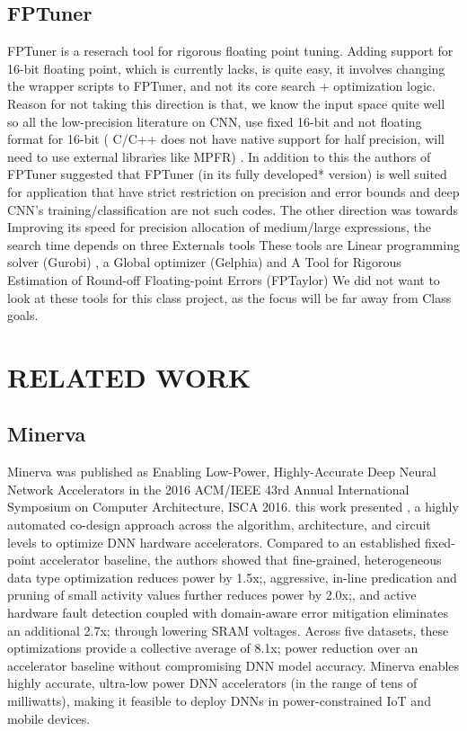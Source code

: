 \documentclass[letterpaper, 10 pt, conference]{ieeeconf}
\begin{document}
\subsection{FPTuner}

FPTuner is a reserach tool for rigorous floating point tuning. Adding support for 16-bit floating point, which is currently
lacks, is quite easy, it involves changing the wrapper scripts to FPTuner, and not its core search + optimization logic.
Reason for not taking this direction is that, we know the input space quite well so all the low-precision 
literature on CNN, use fixed 16-bit and not floating format for 16-bit  ( C/C++ does not have native support
for half precision, will need to use external libraries like MPFR) . In addition to this the authors of 
FPTuner suggested that FPTuner (in its fully developed* version) is well suited for application that have
strict restriction on precision and error bounds and deep CNN’s training/classification are not such codes.
The other direction was towards Improving its speed for precision allocation of medium/large expressions, 
the search time depends on three Externals tools These tools are Linear programming solver (Gurobi) ,
a Global optimizer (Gelphia) and A Tool for Rigorous Estimation of Round-off Floating-point Errors (FPTaylor) 
We did not want to look at these tools for this class project, as the focus will be far away from Class goals.

\section{RELATED WORK}

\subsection{Minerva}

Minerva was published as Enabling Low-Power, Highly-Accurate Deep Neural Network Accelerators in the 
2016 ACM/IEEE 43rd Annual International Symposium on Computer Architecture, ISCA 2016.
this work presented , a highly automated co-design approach across the algorithm, 
architecture, and circuit levels to optimize DNN hardware accelerators.
Compared to an established fixed-point accelerator baseline, the authors showed that fine-grained, 
heterogeneous data type optimization reduces power by 1.5x;, aggressive, in-line predication and 
pruning of small activity values further reduces power by 2.0x;, and 
active hardware fault detection coupled with domain-aware error mitigation eliminates an additional 2.7x; 
through lowering SRAM voltages. 
Across five datasets, these optimizations provide a collective average of 8.1x;
power reduction over an accelerator baseline without compromising DNN model accuracy.
Minerva enables highly accurate, ultra-low power DNN accelerators (in the range of tens of milliwatts), 
making it feasible to deploy DNNs in power-constrained IoT and mobile devices.
\end{document}

